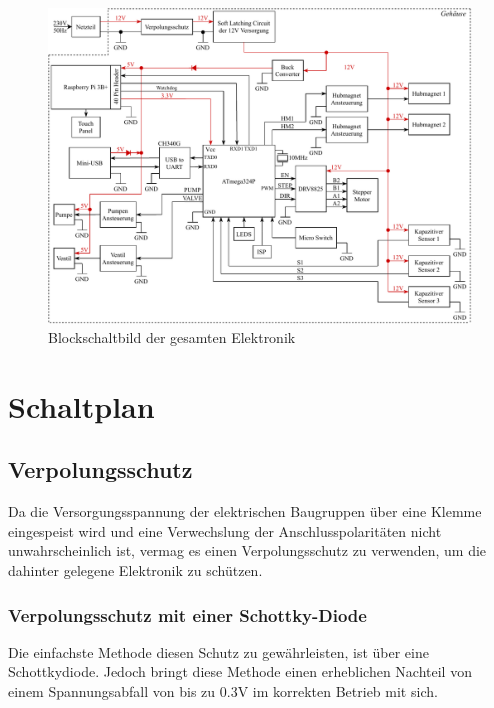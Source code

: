 \begin{figure}[hb]
    \centering
    \includegraphics[scale=0.85,page=1]{fig/elektro/Blockschaltbild.pdf}
    \caption{Blockschaltbild der gesamten Elektronik}\label{fig:Blockschaltbild}
\end{figure}

\newpage


\section{Schaltplan}

\subsection{Verpolungsschutz}
Da die Versorgungsspannung der elektrischen Baugruppen über eine Klemme eingespeist wird und eine Verwechslung der Anschlusspolaritäten nicht unwahrscheinlich ist,
vermag es einen Verpolungsschutz zu verwenden, um die dahinter gelegene Elektronik zu schützen.

\subsubsection{Verpolungsschutz mit einer Schottky-Diode}
Die einfachste Methode diesen Schutz zu gewährleisten, ist über eine Schottkydiode.
Jedoch bringt diese Methode einen erheblichen Nachteil von einem Spannungsabfall von bis zu 0.3V im korrekten Betrieb mit sich.

